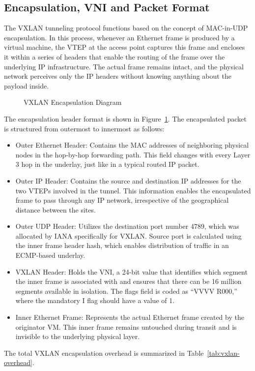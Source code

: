 \subsection{Encapsulation, VNI and Packet Format}
The VXLAN tunneling protocol functions based on the concept of MAC-in-UDP encapsulation\cite{IET_RFC_7348}. In this process, whenever an Ethernet frame is produced by a virtual machine, the VTEP at the access point captures this frame and encloses it within a series of headers that enable the routing of the frame over the underlying IP infrastructure. The actual frame remains intact, and the physical network perceives only the IP headers without knowing anything about the payload inside.

\begin{figure}[!htbp]
    \centering
    \VXLANDiagram
    \caption{VXLAN Encapsulation Diagram}
    \label{fig:vxlan-encapsulation-diagram}
\end{figure}
The encapsulation header format is shown in Figure~\ref{fig:vxlan-encapsulation-diagram}. The encapsulated packet is structured from outermost to innermost as follows:
\begin{itemize}
    \item Outer Ethernet Header: Contains the MAC addresses of neighboring physical nodes in the hop-by-hop forwarding path. This field changes with every Layer 3 hop in the underlay, just like in a typical routed IP packet.
    \item Outer IP Header: Contains the source and destination IP addresses for the two VTEPs involved in the tunnel. This information enables the encapsulated frame to pass through any IP network, irrespective of the geographical distance between the sites.
    \item Outer UDP Header: Utilizes the destination port number 4789, which was allocated by IANA specifically for VXLAN. Source port is calculated using the inner frame header hash, which enables distribution of traffic in an ECMP-based underlay.
    \item VXLAN Header: Holds the VNI, a 24-bit value that identifies which segment the inner frame is associated with and ensures that there can be 16 million segments available in isolation. The flags field is coded as “VVVV R000,” where the mandatory I flag should have a value of 1.
    \item Inner Ethernet Frame: Represents the actual Ethernet frame created by the originator VM. This inner frame remains untouched during transit and is invisible to the underlying physical layer.
\end{itemize}
The total VXLAN encapsulation overhead is summarized in Table~\ref{tab:vxlan-overhead}.

